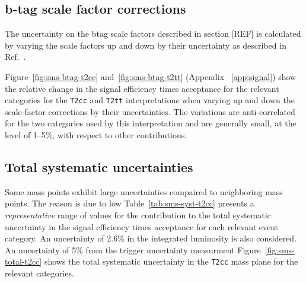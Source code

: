 \subsection{b-tag scale factor corrections\label{sec:sms-syst-btag}}

The uncertainty on the btag scale factors described in section [REF]
is calculated by varying the scale factors up and down by their
uncertainty as described in Ref.~\cite{btagpogtwiki}.

Figure~\ref{fig:sms-btag-t2cc} and~\ref{fig:sms-btag-t2tt} (Appendix ~\ref{app:signal})
show the relative change in the signal efficiency times acceptance for 
the relevant categories for the \verb!T2cc! and \verb!T2tt! interpretations
when varying up and down the scale-factor corrections by their uncertainties. 
The variations  are anti-correlated for the two \nb categories used by this
interpretation and are generally small, at the level of 1--5\%, with
respect to other contributions. 

\subsection{Total systematic uncertainties\label{sec:total-sms-unc}}

Some mass points exhibit large uncertainties compaired to neighboring mass 
points. The reason is due to low Table~\ref{tab:sms-syst-t2cc} presents a {\it representative} range of
values for the contribution to the total systematic uncertainty in the
signal efficiency times acceptance for each relevant event
category. An uncertainty of 2.6\% in the integrated luminosity is also
considered. An uncertainty of 5\% from the trigger uncertainty measurment
Figure~\ref{fig:sms-total-t2cc} shows the total systematic uncertainty 
in the \verb!T2cc! mass plane for the relevant categories.

